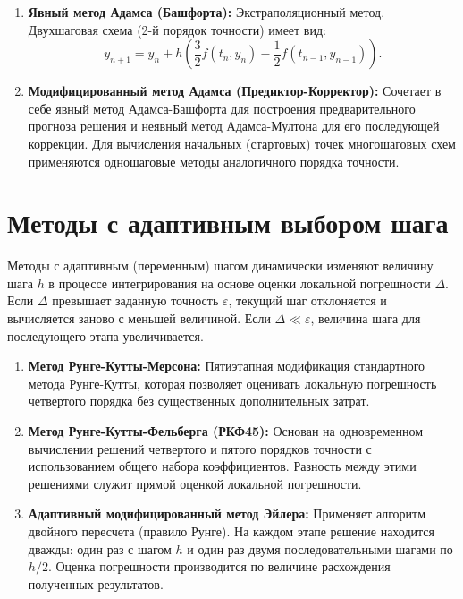 \documentclass[a4paper]{article}
\begin{document}
\begin{enumerate}
    \item \textbf{Явный метод Адамса (Башфорта):}
    Экстраполяционный метод. Двухшаговая схема (2-й порядок точности) имеет вид:
    \begin{equation}
    y_{n+1} = y_n + h \left( \frac{3}{2}f(t_n, y_n) - \frac{1}{2}f(t_{n-1}, y_{n-1}) \right).
    \end{equation}
    
    \item \textbf{Модифицированный метод Адамса (Предиктор-Корректор):}
    Сочетает в себе явный метод Адамса-Башфорта для построения предварительного прогноза решения и неявный метод Адамса-Мултона для его последующей коррекции. Для вычисления начальных (стартовых) точек многошаговых схем применяются одношаговые методы аналогичного порядка точности.
\end{enumerate}

\section{Методы с адаптивным выбором шага}
Методы с адаптивным (переменным) шагом динамически изменяют величину шага $h$ в процессе интегрирования на основе оценки локальной погрешности $\Delta$. Если $\Delta$ превышает заданную точность $\varepsilon$, текущий шаг отклоняется и вычисляется заново с меньшей величиной. Если $\Delta \ll \varepsilon$, величина шага для последующего этапа увеличивается.

\begin{enumerate}
    \item \textbf{Метод Рунге-Кутты-Мерсона:}
    Пятиэтапная модификация стандартного метода Рунге-Кутты, которая позволяет оценивать локальную погрешность четвертого порядка без существенных дополнительных затрат.
    
    \item \textbf{Метод Рунге-Кутты-Фельберга (РКФ45):}
    Основан на одновременном вычислении решений четвертого и пятого порядков точности с использованием общего набора коэффициентов. Разность между этими решениями служит прямой оценкой локальной погрешности.
    
    \item \textbf{Адаптивный модифицированный метод Эйлера:}
    Применяет алгоритм двойного пересчета (правило Рунге). На каждом этапе решение находится дважды: один раз с шагом $h$ и один раз двумя последовательными шагами по $h/2$. Оценка погрешности производится по величине расхождения полученных результатов.
\end{enumerate}
\end{document}
